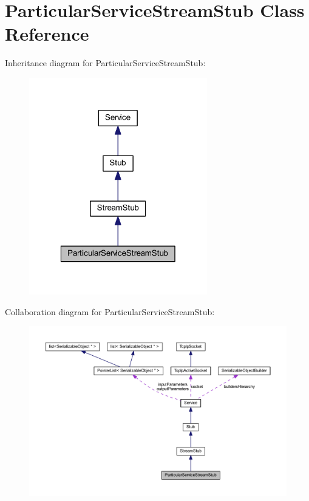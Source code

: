 \hypertarget{class_particular_service_stream_stub}{
\section{ParticularServiceStreamStub Class Reference}
\label{class_particular_service_stream_stub}
}


Inheritance diagram for ParticularServiceStreamStub:\nopagebreak
\begin{figure}[H]
\begin{center}
\leavevmode
\includegraphics[width=220pt]{class_particular_service_stream_stub__inherit__graph}
\end{center}
\end{figure}


Collaboration diagram for ParticularServiceStreamStub:\nopagebreak
\begin{figure}[H]
\begin{center}
\leavevmode
\includegraphics[width=400pt]{class_particular_service_stream_stub__coll__graph}
\end{center}
\end{figure}
